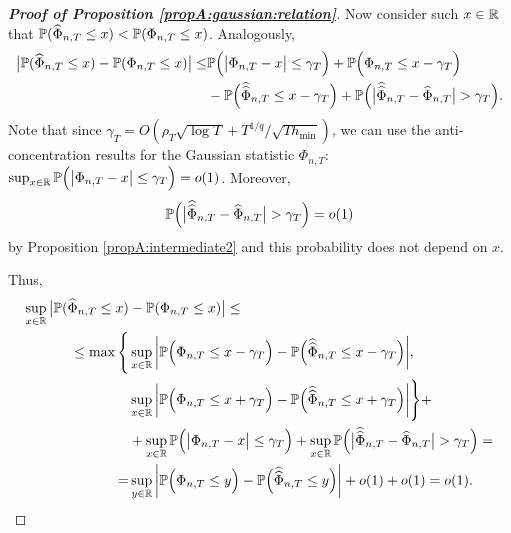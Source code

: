 \documentclass[a4paper,12pt]{article}
\makeatletter
\renewcommand{\eqref}[1]{\tagform@{\ref{#1}}}
\newcommand{\doublehattwo}[1]{\widehat{\widehat{#1}}}
\makeatother
\begin{document}
\begin{proof}[\textnormal{\textbf{Proof of Proposition \ref{propA:gaussian:relation}}}]
Now consider such $x\in \mathbb{R}$ that $\mathbb{P}(\widehat{\Phi}_{n,T}\le x) < \mathbb{P}(\Phi_{n, T}\le x)$. Analogously, 
\begin{align*}
\big| \pr(\widehat{\Phi}_{n, T} \le x) - \pr(\Phi_{n,T} \le x) \big| \le &\pr\Big(\big|\Phi_{n,T} - x \big| \le \gamma_{T}\Big) +\pr\Big(\Phi_{n,T} \le x - \gamma_{T}\Big)\\
& -\pr\Big(\doublehattwo{\Phi}_{n,T} \le x - \gamma_{T}\Big) +  \pr \Big(\big|\doublehattwo{\Phi}_{n,T} - \widehat{\Phi}_{n,T}\big| > \gamma_{T} \Big).  
\end{align*}
Note that since \textcolor{black}{$ \gamma_{T} = O(\rho_T \sqrt{\log T} + T^{1/q}/\sqrt{T h_{\min}})$}, we can use the anti-concentration results \eqref{eqA:anticon} for the Gaussian statistic $\Phi_{n,T}$: $\sup_{x\in \mathbb{R}}\mathbb{P}\Big(\big|\Phi_{n,T} - x \big| \le \gamma_{T}\Big) = o(1)$. Moreover, $$\pr \Big(\big|\doublehattwo{\Phi}_{n,T} - \widehat{\Phi}_{n,T}\big| > \gamma_{T} \Big) = o(1)$$ by Proposition \ref{propA:intermediate2} and this probability does not depend on $x$.

Thus, 
\begin{align*}
\sup_{x \in \reals} \big| \pr(\widehat{\Phi}_{n, T} \le x) &- \pr(\Phi_{n,T} \le x) \big| \le \\
\le \max \Bigg\{ &\sup_{x \in \reals} \bigg| \pr\Big(\Phi_{n,T} \le x - \gamma_{T}\Big) -\pr\Big(\doublehattwo{\Phi}_{n,T} \le x - \gamma_{T}\Big)\bigg|, \\
&\sup_{x \in \reals} \bigg| \pr\Big(\Phi_{n,T} \le x + \gamma_{T}\Big) -\pr\Big(\doublehattwo{\Phi}_{n,T} \le x + \gamma_{T}\Big)\bigg| \Bigg\} + \\
&+\sup_{x\in \reals}\pr\Big(\big|\Phi_{n,T} - x \big| \le \gamma_{T}\Big) + \sup_{x\in\reals}\pr \Big(\big|\doublehattwo{\Phi}_{n,T} - \widehat{\Phi}_{n,T}\big| > \gamma_{T} \Big) = \\
=&\sup_{y \in \reals} \bigg| \pr\Big(\Phi_{n,T} \le y\Big) -\pr\Big(\doublehattwo{\Phi}_{n,T} \le y\Big)\bigg| + o(1) + o(1) = o(1).
\end{align*}
\end{proof}
\end{document}
